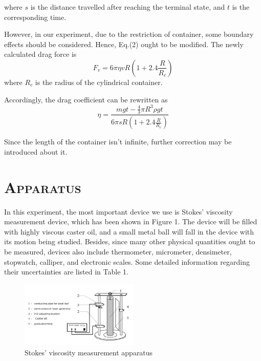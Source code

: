 \documentclass[a4paper,12pt]{article}
\begin{document}
where $s$ is the distance travelled after reaching the terminal state, and $t$ is the corresponding time.
\par However, in our experiment, due to the restriction of container, some boundary effects should be considered. Hence, Eq.(2) ought to be modified. The newly calculated drag force is
\begin{equation}
F_v = 6\pi \eta vR (1+2.4\frac{R}{R_c})
\end{equation}
where $R_c$ is the radius of the cylindrical container.
\par Accordingly, the drag coefficient can be rewritten as 
\begin{equation}
\eta = \frac{mgt-\frac{4}{3}\pi R^3\rho gt}{6\pi sR(1+2.4\frac{R}{R_c})}
\end{equation}
\par Since the length of the container isn't infinite, further correction may be introduced about it.
\section{\textsc{Apparatus}}
In this experiment, the most important device we use is Stokes’ viscosity measurement device, which has been shown in Figure 1. The device will be filled with highly viscous caster oil, and a small metal ball will fall in the device with its motion being studied. Besides, since many other physical quantities ought to be measured, devices also include thermometer, micrometer, densimeter, stopwatch, calliper, and electronic scales. Some detailed information regarding their uncertainties are listed in Table 1.

\begin{figure}[h] 
    \centering
    \includegraphics[width=0.5\textwidth]{Fig1} 
    \caption{Stokes’ viscosity measurement apparatus \cite{labmanual}} 
\end{figure}
\end{document}
